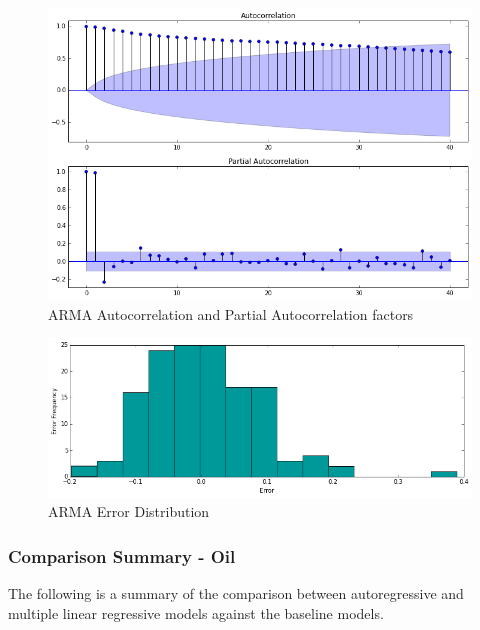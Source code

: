 \documentclass[runningheads]{llncs}
\begin{document}
\begin{figure}
\centering
\includegraphics[width=\textwidth]{arma_autocorrelation.png}
\caption{ARMA Autocorrelation and Partial Autocorrelation factors}
\label{fig:arma_autocorrelation.png}
\end{figure}

\begin{figure}
\centering
\includegraphics[width=\textwidth]{arma_error_histogram.png}
\caption{ARMA Error Distribution}
\label{fig:arma_error_histogram.png}
\end{figure}

\newpage
\subsubsection {Comparison Summary - Oil} The following is a summary of the comparison between autoregressive and multiple linear regressive models against the baseline models. \\
\end{document}
